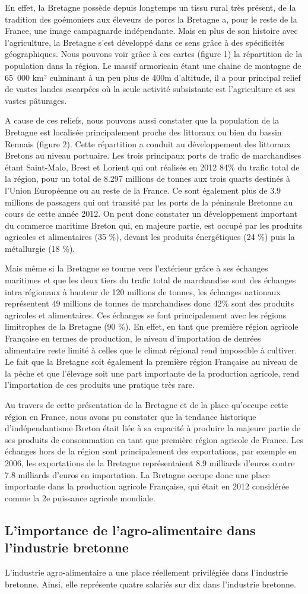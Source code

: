 \documentclass[a4paper,10pt]{report}
\begin{document}
En effet, la Bretagne possède depuis longtemps un tissu rural très présent, de la tradition des goémoniers aux éleveurs de porcs la Bretagne a, pour le reste de la France, une image campagnarde indépendante. Mais en plus de son histoire avec l’agriculture, la Bretagne s’est développé dans ce sens grâce à des spécificités géographiques. Nous pouvons voir grâce à ces cartes (figure 1) la répartition de la population dans la région. Le massif armoricain étant une chaine de montagne de 65 000 km² culminant à un peu plus de 400m d’altitude, il a pour principal relief de vastes landes escarpées où la seule activité subsistante est l’agriculture et ses vastes pâturages.

A cause de ces reliefs, nous pouvons aussi constater que la population de la Bretagne est localisée principalement proche des littoraux ou bien du bassin Rennais (figure 2). Cette répartition a conduit au développement des littoraux Bretons au niveau portuaire. Les trois principaux ports de trafic de marchandises étant Saint-Malo, Brest et Lorient qui ont réalisés en 2012 84\% du trafic total de la région, pour un total de 8.297 millions de tonnes aux trois quarts destinés à l’Union Européenne ou au reste de la France. Ce sont également plus de 3.9 millions de passagers qui ont  transité par les ports de la péninsule Bretonne au cours de cette année 2012. On peut donc constater un développement important du commerce maritime Breton qui, en majeure partie, est occupé par les produits agricoles et alimentaires (35 \%), devant les produits énergétiques (24 \%) puis la métallurgie (18 \%).

Mais même si la Bretagne se tourne vers l’extérieur grâce à ses échanges maritimes et que les deux tiers du trafic total de marchandise sont des échanges intra régionaux à hauteur de 120 millions de tonnes, les échanges nationaux représentent 49 millions de tonnes de marchandises donc 42\% sont des produits agricoles et alimentaires. Ces échanges se font principalement avec les régions limitrophes de la Bretagne (90 \%). En effet, en tant que première région agricole Française en termes de production, le niveau d’importation de denrées alimentaire reste limité à celles que le climat régional rend impossible à cultiver. Le fait que la Bretagne soit également la première région Française au niveau de la pêche et que l’élevage soit une part importante de la production agricole, rend l’importation de ces produits une pratique très rare.

Au travers de cette présentation de la Bretagne et de la place qu’occupe cette région en France, nous avons pu constater que la tendance historique d’indépendantisme Breton était liée à sa capacité à produire la majeure partie de ses produits de consommation en tant que première région agricole de France. Les échanges hors de la région sont principalement des exportations, par exemple en 2006, les exportations de la Bretagne représentaient 8.9 milliards d’euros contre 7.8 milliards d’euros en importation. La Bretagne occupe donc une place importante dans la production agricole Française, qui était en 2012 considérée comme la 2e puissance agricole mondiale.

\subsection{L'importance de l'agro-alimentaire dans l'industrie bretonne}
L’industrie agro-alimentaire a une place réellement privilégiée dans l’industrie bretonne. Ainsi, elle représente quatre salariés sur dix dans l’industrie bretonne.
\end{document}
